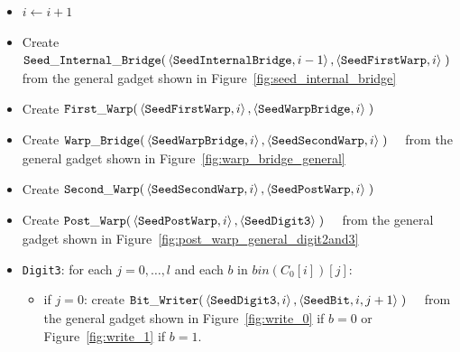 \begin{itemize}
    \item $i \gets i + 1$

    \item Create
    $\begin{aligned}[t]
        {\tt Seed\_Internal\_Bridge}(&\left\langle {\tt SeedInternalBridge}, i - 1 \right\rangle,
                                      \left\langle {\tt SeedFirstWarp}, i \right\rangle \;)
    \end{aligned}$ from the general gadget shown in Figure~\ref{fig:seed_internal_bridge}

    \item Create
    $\begin{aligned}[t]
        {\tt First\_Warp}(&\left\langle {\tt SeedFirstWarp},  i \right\rangle,
                    \left\langle {\tt SeedWarpBridge}, i \right\rangle \;)
    \end{aligned}$

    \item Create
    $\begin{aligned}[t]
        {\tt Warp\_Bridge}(&\left\langle {\tt SeedWarpBridge}, i \right\rangle,
                     \left\langle {\tt SeedSecondWarp}, i \right\rangle \;)
    \end{aligned}$ from the general gadget shown in Figure~\ref{fig:warp_bridge_general}

    \item Create
    $\begin{aligned}[t]
        {\tt Second\_Warp}(&\left\langle {\tt SeedSecondWarp}, i  \right\rangle,
                     \left\langle {\tt SeedPostWarp},   i  \right\rangle \;)
    \end{aligned}$

    \item Create
    $\begin{aligned}[t]
        {\tt Post\_Warp}(&\left\langle {\tt SeedPostWarp}, i \right\rangle,
                   \left\langle {\tt SeedDigit3} \right\rangle \;)
    \end{aligned}$ from the general gadget shown in Figure~\ref{fig:post_warp_general_digit2and3}


    \item {\tt Digit3}: for each $j=0,\ldots,l$ and each $b$ in $bin(C_0[i])[j]$:
    \begin{itemize}
        \item if $j = 0$: create
        $\begin{aligned}[t]
            {\tt Bit\_Writer}(&\left\langle {\tt SeedDigit3}, i \right\rangle, \left\langle {\tt SeedBit}, i, j + 1 \right\rangle \;)
        \end{aligned}$ from the general gadget shown in Figure~\ref{fig:write_0} if $b = 0$ or Figure~\ref{fig:write_1} if $b = 1$.


\end{itemize}
\end{itemize}
